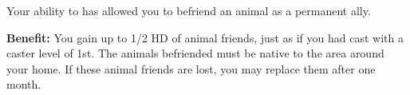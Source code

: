 
Your ability to  has allowed you to befriend an animal as a permanent ally.

\textbf{Benefit:} You gain up to 1/2 HD of animal friends, just as if you had cast  with a caster level of 1st. The animals befriended must be native to the area around your home. If these animal friends are lost, you may replace them after one month.